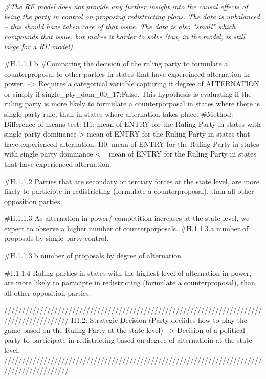 \documentclass[
]{article}
\newenvironment{Shaded}{\begin{snugshade}}{\end{snugshade}}
\newcommand{\CommentTok}[1]{\textcolor[rgb]{0.56,0.35,0.01}{\textit{#1}}}
\begin{document}
\begin{Shaded}
\begin{Highlighting}[]
\CommentTok{#The RE model does not provide any further insight into the causal effects of being the party in control on proposing redistricting plans. The data is unbalanced -- this should have taken care of that issue. The data is also "small" which compounds that issue, but makes it harder to solve (tau, in the model, is still large for a RE model).}
\end{Highlighting}
\end{Shaded}

\#H.1.1.1.b \#Comparing the decision of the ruling party to formulate a
counterproposal to other parties in states that have expereinced
alternation in power. --\textgreater{} Requires a categorical variable
capturing if degree of ALTERNATION or simply if
single\_pty\_dom\_00\_17:False. This hypothesis is evaluating if the
ruling party is more likely to formulate a counterporposal in states
where there is single party rule, than in states where alternation takes
place. \#Method: Difference of means test: H1: mean of ENTRY for the
Ruling Party in states with single party dominance \textgreater{} mean
of ENTRY for the Ruling Party in states that have experienced
alternation; H0: mean of ENTRY for the Ruling Party in states with
single party dominance \textless= mean of ENTRY for the Ruling Party in
states that have experienced alternation.

\#H.1.1.2 Parties that are secondary or terciary forces at the state
level, are more likely to participte in redistricting (formulate a
counterproposal), than all other opposition parties.

\#H.1.1.3 As alternation in power/ competition increases at the state
level, we expect to observe a higher number of counterporposals.
\#H.1.1.3.a number of proposals by single party control.

\#H.1.1.3.b number of proposals by degree of alternation

\#1.1.1.4 Ruling parties in states with the highest level of alternation
in power, are more likely to participte in redistricting (formulate a
counterproposal), than all other opposition parties.

//////////////////////////////////////////////////////////////////////////////////////////
H1.2: Strategic Decision (Party deciides how to play the game based on
the Ruling Party at the state level) --\textgreater{} Decision of a
political party to participate in redistricting based on degree of
alternatioin at the state level.
//////////////////////////////////////////////////////////////////////////////////////////
\end{document}
